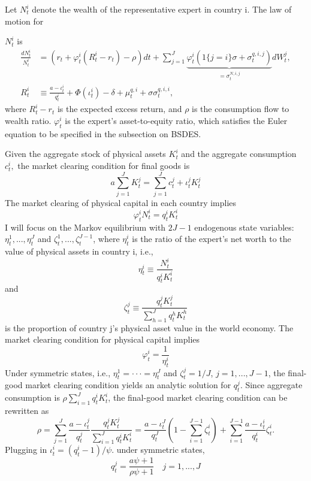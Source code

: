 \documentclass{article}
\begin{document}
Let $N_{t}^{i}$ denote the wealth of the representative expert in country i. The law of motion for

\clearpage

$N_{t}^{i}$ is
\begin{align*}
\frac{dN_{t}^{i}}{N_{t}^{i}}&=(r_{t}+\varphi_{t}^{i}(R_{t}^{i}-r_{t})-\rho)dt+\sum_{j=1}^{J}\underbrace{\varphi_{t}^{i}(1\{j=i\}\sigma+\sigma_{t}^{q,i,j})}_{=\sigma_{t}^{N,i,j}}dW_{t}^{j}, \\
R_{t}^{i}&\equiv\frac{a-\iota_{t}^{i}}{q_{t}^{i}}+\Phi(\iota_{t}^{i})-\delta+\mu_{t}^{q,i}+\sigma\sigma_{t}^{q,i,i},
\end{align*}
where $R_{t}^{i}-r_{t}$ is the expected excess return, and $\rho$ is the consumption flow to wealth ratio. $\varphi_{t}^{i}$ is the expert's asset-to-equity ratio, which satisfies the Euler equation to be specified in the subsection on BSDES.

Given the aggregate stock of physical assets $K_{t}^{i}$ and the aggregate consumption $c_{t}^{i},$ the market clearing condition for final goods is
\[
a\sum_{j=1}^{J}K_{t}^{j}=\sum_{j=1}^{J}c_{t}^{j}+\iota_{t}^{j}K_{t}^{j}
\]
The market clearing of physical capital in each country implies
\[
\varphi_{t}^{i}N_{t}^{i}=q_{t}^{i}K_{t}^{i}
\]
I will focus on the Markov equilibrium with $2J-1$ endogenous state variables: $\eta_{t}^{1},...,\eta_{t}^{J}$ and $\zeta_{t}^{1},...,\zeta_{t}^{J-1}$, where $\eta_{t}^{i}$ is the ratio of the expert's net worth to the value of physical assets in country i, i.e.,
\[
\eta_{t}^{i}\equiv\frac{N_{t}^{i}}{q_{t}^{i}K_{t}^{i}}
\]
and
\[
\zeta_{t}^{j}\equiv\frac{q_{t}^{j}K_{t}^{j}}{\sum_{h=1}^{J}q_{t}^{h}K_{t}^{h}}
\]
is the proportion of country j's physical asset value in the world economy. The market clearing condition for physical capital implies
\[
\varphi_{t}^{i}=\frac{1}{\eta_{t}^{i}}
\]
Under symmetric states, i.e., $\eta_{t}^{1}=\cdot\cdot\cdot=\eta_{t}^{J}$ and $\zeta_{t}^{j}=1/J$, $j=1,...,J-1$, the final-good market clearing condition yields an analytic solution for $q_{t}^{j}$. Since aggregate consumption is $\rho\sum_{i=1}^{J}q_{t}^{i}K_{t}^{i}$, the final-good market clearing condition can be rewritten as
\begin{equation}
\rho=\sum_{j=1}^{J}\frac{a-\iota_{t}^{j}}{q_{t}^{j}}\frac{q_{t}^{j}K_{t}^{j}}{\sum_{i=1}^{J}q_{t}^{i}K_{t}^{i}}=\frac{a-\iota_{t}^{J}}{q_{t}^{J}}(1-\sum_{i=1}^{J-1}\zeta_{t}^{i})+\sum_{i=1}^{J-1}\frac{a-\iota_{t}^{i}}{q_{t}^{i}}\zeta_{t}^{i}.
\label{eq:19}
\end{equation}
Plugging in $\iota_{t}^{i}=(q_{t}^{i}-1)/\psi.$ under symmetric states,
\[
q_{t}^{j}=\frac{a\psi+1}{\rho\psi+1} \quad j=1,...,J
\]
\end{document}
